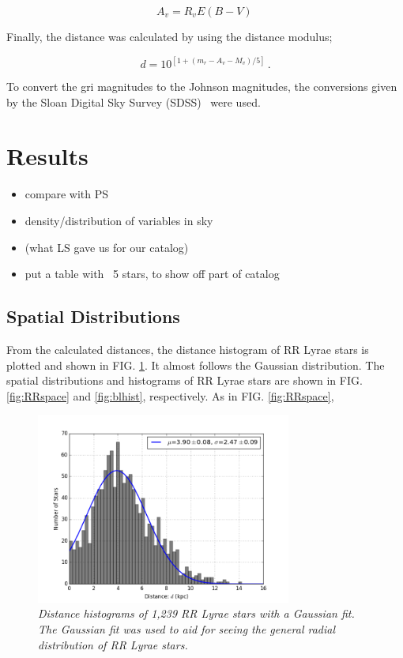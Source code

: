 \documentclass[aps,prb,twocolumn,superscriptaddress]{revtex4-1}
\begin{document}
\begin{equation}
\label{Av}
A_v = R_v E(B-V) \,
\end{equation}

\noindent Finally, the distance was calculated by using the distance modulus;

\begin{equation}
\label{dist}
d = 10^{[1+(m_r - A_v - M_v)/5]} \, .
\end{equation}

\noindent To convert the gri magnitudes to the Johnson magnitudes, the conversions given by the Sloan Digital Sky Survey (SDSS)~\cite{SDSS} were used.

\section{Results}
\begin{itemize}
	\item{} compare with PS~\cite{PSdata}
	\item{} density/distribution of variables in sky
	\item{} (what LS gave us for our catalog)
	\item{} put a table with ~5 stars, to show off part of catalog
\end{itemize}




\subsection{Spatial Distributions}

From the calculated distances, the distance histogram of RR Lyrae stars is plotted and shown in FIG. \ref{fig:dhist}. It almost follows the Gaussian distribution. The spatial distributions and histograms of RR Lyrae stars are shown in  FIG. \ref{fig:RRspace} and \ref{fig:blhist}, respectively. As in FIG. \ref{fig:RRspace}, 

\begin{figure}[H]
 \centering
 	\includegraphics[width=3.3in]{figures/PlotsSpace15/gdhist_limit15.png}
 \caption{\it \small{Distance histograms of 1,239 RR Lyrae stars with a Gaussian fit. The Gaussian fit was used to aid for seeing the general radial distribution of RR Lyrae stars. }} 
 \label{fig:dhist}
\end{figure} 
\end{document}
